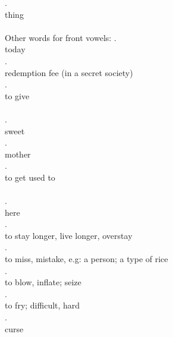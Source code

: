\documentclass{assets/fieldnotes}
\begin{document}
\ex. \\
thing\\
\\

Other words for front vowels:
\ex. \\
today\\ %

\ex. \\
redemption fee (in a secret society)\\

\ex. \\
to give\\
\\

\ex. \\
sweet\\

\ex. \\
mother\\

\ex. \\
to get used to\\
\\

\ex. \\
here\\

\ex. \\
to stay longer, live longer, overstay\\

\ex. \\
to miss, mistake, e.g: a person; a type of rice\\

\ex. \\
to blow, inflate; seize\\

\ex. \\
to fry; difficult, hard\\

\ex. \\
curse\\
\\
\end{document}
